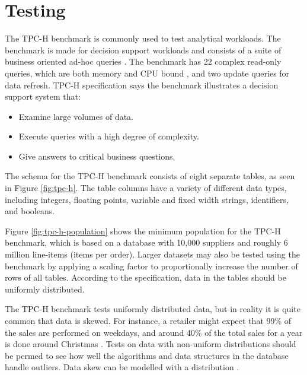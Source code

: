 \section{Testing}
\label{sec:Testing}
The TPC-H benchmark is commonly used to test analytical workloads. The benchmark is made for decision support workloads and consists of a suite of business oriented ad-hoc queries \cite{Transaction_Processing_Performance_Council_TPC2014-ux}. The benchmark has 22 complex read-only queries, which are both memory and CPU bound \cite{Boncz2005-wj}, and two update queries for data refresh. TPC-H specification says the benchmark illustrates a decision support system that:
\begin{itemize}
  \item Examine large volumes of data.
  \item Execute queries with a high degree of complexity.
  \item Give answers to critical business questions.
\end{itemize}

The schema for the TPC-H benchmark consists of eight separate tables, as seen in Figure \ref{fig:tpc-h}. The table columns have a variety of different data types, including integers, floating points, variable and fixed width strings, identifiers, and booleans. 

Figure \ref{fig:tpc-h-population} shows the minimum population for the TPC-H benchmark, which is based on a database with 10,000 suppliers and roughly 6 million line-items (items per order). Larger datasets may also be tested using the benchmark by applying a scaling factor to proportionally increase the number of rows of all tables. According to the specification, data in the tables should be uniformly distributed.

The TPC-H benchmark tests uniformly distributed data, but in reality it is quite common that data is skewed. For instance, a retailer might expect that 99\% of the sales are performed on weekdays, and around 40\% of the total sales for a year is done around Christmas \cite{Raman2008-gi}. Tests on data with non-uniform distributions should be permed to see how well the algorithms and data structures in the database handle outliers. Data skew can be modelled with a  distribution \cite{Holloway2008-rr}. 

